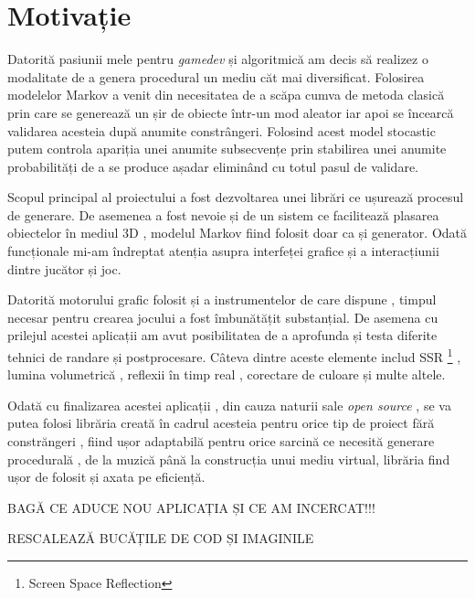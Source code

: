 \chapter*{Motivație} 

Datorită pasiunii mele pentru \textit{gamedev} și algoritmică am decis să realizez o modalitate de a genera procedural un mediu căt mai diversificat. Folosirea modelelor Markov a venit din necesitatea de a scăpa cumva de metoda clasică prin care se generează un șir de obiecte într-un mod aleator iar apoi se încearcă validarea acesteia după anumite constrângeri. Folosind acest model stocastic putem controla apariția unei anumite subsecvențe prin stabilirea unei anumite probabilități de a se produce așadar eliminând cu totul pasul de validare.\par

Scopul principal al proiectului a fost dezvoltarea unei librări ce ușurează procesul de generare. De asemenea a fost nevoie și de un sistem ce facilitează plasarea obiectelor în mediul 3D , modelul Markov fiind folosit doar ca și generator. Odată funcționale mi-am îndreptat atenția asupra interfeței grafice și a interacțiunii dintre jucător și joc.\par

Datorită motorului grafic folosit și a instrumentelor de care dispune , timpul necesar pentru crearea jocului a fost îmbunătățit substanțial. De asemena cu prilejul acestei aplicații am avut posibilitatea de a aprofunda și testa diferite tehnici de randare și postprocesare. Câteva dintre aceste elemente includ SSR \footnote{Screen Space Reflection} , lumina volumetrică  , reflexii în timp real , corectare de culoare și multe altele.\par

Odată cu finalizarea acestei aplicații , din cauza naturii sale \textit{open source} , se va putea folosi librăria creată în cadrul acesteia pentru orice tip de proiect fără constrăngeri , fiind ușor adaptabilă pentru orice sarcină ce necesită generare procedurală , de la muzică până la construcția unui mediu virtual, librăria find ușor de folosit și axata pe eficiență.\par

BAGĂ CE ADUCE NOU APLICAȚIA ȘI CE AM INCERCAT!!!

RESCALEAZĂ BUCĂȚILE DE COD ȘI IMAGINILE